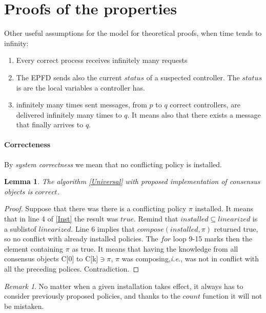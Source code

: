 \documentclass{article}
\newtheorem{lemma}{Lemma}
\theoremstyle{remark}
\newtheorem*{remark}{Remark}
\begin{document}
\section{Proofs of the properties}
Other useful assumptions for the model for theoretical proofs, when time tends to infinity:
\begin{enumerate}
\item Every correct process receives infinitely many requests
\item The EPFD sends also the current $status$ of a suspected controller. The $status$ is are the local variables a controller has.
\item infinitely many times sent messages, from $p$ to $q$ correct controllers, are delivered infinitely many times to $q$. It means also that there exists a message that finally arrives to $q$.
\end{enumerate}

\paragraph{Correcteness} 
By \emph{system correctness} we mean that no conflicting policy is installed.
\begin{lemma}\label{Correctness}
The algorithm \ref{Universal} with proposed implementation of consensus objects is $correct$. 
\end{lemma}
\begin{proof}
Suppose that there was there is a conflicting policy $\pi$ installed. It means that in line 4 of \ref{Inst} the result was $true$. Remind that $installed\subseteq linearized$ is a sublist\footnotemark of $linearized$. 
 Line 6 implies that $compose(installed,\pi)$ returned true, so no conflict with already installed policies. The $for$ loop 9-15 marks then the element containing $\pi$ as true. It means that having the knowledge from all consensus objects C[0] to C[k]$\ni\pi$, $\pi$ was composing,\emph{i.e.}, was not in conflict with all the preceding polices. Contradiction.
\end{proof}
\begin{remark}
No matter when a given installation takes effect, it always has to consider previously proposed policies, and thanks to the $count$ function it will not be mistaken.
\end{remark}
\end{document}
